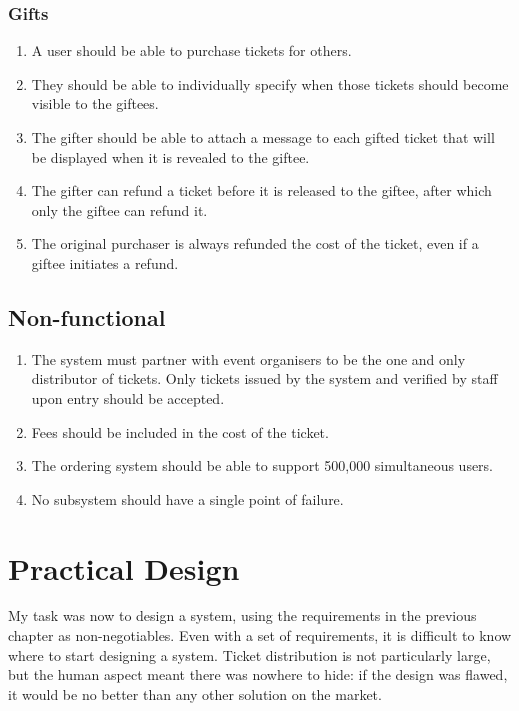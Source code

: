\documentclass[12pt]{bhamdissertation}
\begin{document}
\subsection{Gifts}

\begin{enumerate}[resume]
    \item A user should be able to purchase tickets for others.
    \item They should be able to individually specify when those tickets should become visible to the giftees.
    \item The gifter should be able to attach a message to each gifted ticket that will be displayed when it is revealed to the giftee.
    \item The gifter can refund a ticket before it is released to the giftee, after which only the giftee can refund it.
    \item The original purchaser is always refunded the cost of the ticket, even if a giftee initiates a refund.
\end{enumerate}

\section{Non-functional}

\begin{enumerate}[resume]
    \item The system must partner with event organisers to be the one and only distributor of tickets. Only tickets issued by the system and verified by staff upon entry should be accepted.
    \item Fees should be included in the cost of the ticket.
    \item The ordering system should be able to support 500,000 simultaneous users.
    \item No subsystem should have a single point of failure.
\end{enumerate}

\chapter{Practical Design}

My task was now to design a system, using the requirements in the previous chapter as non-negotiables. Even with a set of requirements, it is difficult to know where to start designing a system. Ticket distribution is not particularly large, but the human aspect meant there was nowhere to hide: if the design was flawed, it would be no better than any other solution on the market.
\end{document}
